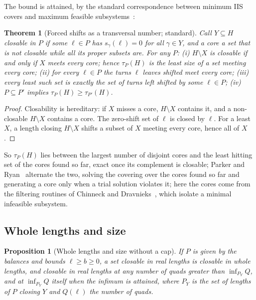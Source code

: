 \documentclass[11pt,a4paper]{article}
\newtheorem{theorem}{Theorem}
\newtheorem{proposition}{Proposition}
\newcommand{\shift}{s}
\newcommand{\lean}[1]{\texttt{\detokenize{#1}}}
\newenvironment{evidence}[3][]{}{}
\begin{document}
The bound is attained, by the standard correspondence between minimum IIS
covers and maximum feasible subsystems~\cite{amaldi2003maxfs,parker1996iis}:

\begin{evidence}{cited}{\cite{amaldi2003maxfs,parker1996iis}; (ii) also in Lean: \lean{meets_infeasible}}
\begin{theorem}[Forced shifts as a transversal number; standard]\label{thm:transversal}
Call $Y \subseteq H$ \emph{closable} in $P$ if some $\ell \in P$ has
$\shift_\gamma(\ell) = 0$ for all $\gamma \in Y$, and a \emph{core} a set that
is not closable while all its proper subsets are. For any $P$:
(i) $H \setminus X$ is closable if and only if $X$ meets every core; hence
$\tau_P(H)$ is the least size of a set meeting every core;
(ii) for every $\ell \in P$ the turns $\ell$ leaves shifted meet every core;
(iii) every least such set is exactly the set of turns left shifted by some
$\ell \in P$;
(iv) $P \subseteq P'$ implies $\tau_P(H) \ge \tau_{P'}(H)$.
\end{theorem}
\end{evidence}

\begin{proof}
Closability is hereditary: if $X$ misses a core, $H \setminus X$ contains it,
and a non-closable $H \setminus X$ contains a core. The zero-shift set of
$\ell$ is closed by $\ell$. For a least $X$, a length closing $H \setminus X$
shifts a subset of $X$ meeting every core, hence all of $X$.
\end{proof}

So $\tau_P(H)$ lies between the largest number of disjoint cores and the
least hitting set of the cores found so far, exact once its complement is
closable; Parker and Ryan~\cite{parker1996iis} alternate the two, solving
the covering over the cores found so far and generating a core only when a
trial solution violates it; here the cores come from the
filtering routines of Chinneck and Dravnieks~\cite{chinneck1991locating},
which isolate a minimal infeasible subsystem.

\subsection{Whole lengths and size}\label{sec:whole}

\begin{evidence}{core}{\lean{closable_at_any_size}, \lean{smul_mem_system}, \lean{whole_solution_of_real}; assumed: the number of quads is homogeneous of degree two in the lengths; the infimum is taken on paper}
\begin{proposition}[Whole lengths and size without a cap]\label{prop:whole-size}
If $P$ is given by the balances and bounds $\ell \ge b \ge 0$, a set closable
in real lengths is closable in whole lengths, and closable in real lengths at
any number of quads greater than $\inf_{P_Y} Q$, and at $\inf_{P_Y} Q$ itself
when the infimum is attained, where $P_Y$ is the set of lengths of $P$ closing
$Y$ and $Q(\ell)$ the number of quads.
\end{proposition}
\end{evidence}
\end{document}

